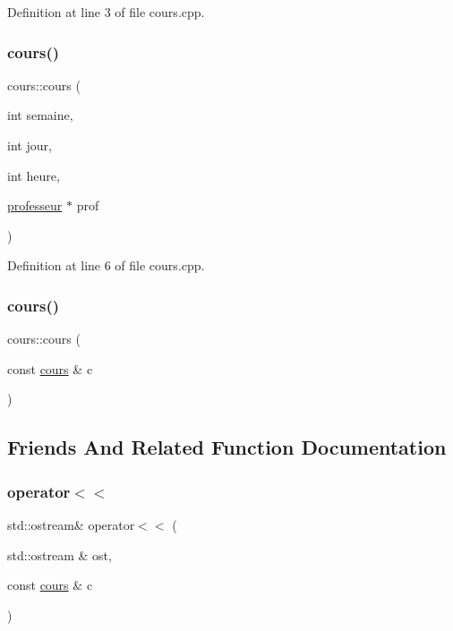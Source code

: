 Definition at line 3 of file cours.\+cpp.

\hypertarget{classcours_a76210058976f92c2f09b047f68fa2e82}{}\label{classcours_a76210058976f92c2f09b047f68fa2e82} 
\subsubsection{\texorpdfstring{cours()}{cours()}\hspace{0.1cm}{\footnotesize\ttfamily [2/3]}}
{\footnotesize\ttfamily cours\+::cours (\begin{DoxyParamCaption}\item[{int}]{semaine,  }\item[{int}]{jour,  }\item[{int}]{heure,  }\item[{\hyperlink{classprofesseur}{professeur} $\ast$}]{prof }\end{DoxyParamCaption})}



Definition at line 6 of file cours.\+cpp.

\hypertarget{classcours_a95b69b7789c5dab7116c0b89d78197ec}{}\label{classcours_a95b69b7789c5dab7116c0b89d78197ec} 
\subsubsection{\texorpdfstring{cours()}{cours()}\hspace{0.1cm}{\footnotesize\ttfamily [3/3]}}
{\footnotesize\ttfamily cours\+::cours (\begin{DoxyParamCaption}\item[{const \hyperlink{classcours}{cours} \&}]{c }\end{DoxyParamCaption})\hspace{0.3cm}{\ttfamily [default]}}



\subsection{Friends And Related Function Documentation}
\hypertarget{classcours_aecc19592d3206061c4aefd63e2cf7473}{}\label{classcours_aecc19592d3206061c4aefd63e2cf7473} 
\subsubsection{\texorpdfstring{operator$<$$<$}{operator<<}}
{\footnotesize\ttfamily std\+::ostream\& operator$<$$<$ (\begin{DoxyParamCaption}\item[{std\+::ostream \&}]{ost,  }\item[{const \hyperlink{classcours}{cours} \&}]{c }\end{DoxyParamCaption})\hspace{0.3cm}{\ttfamily [friend]}}



